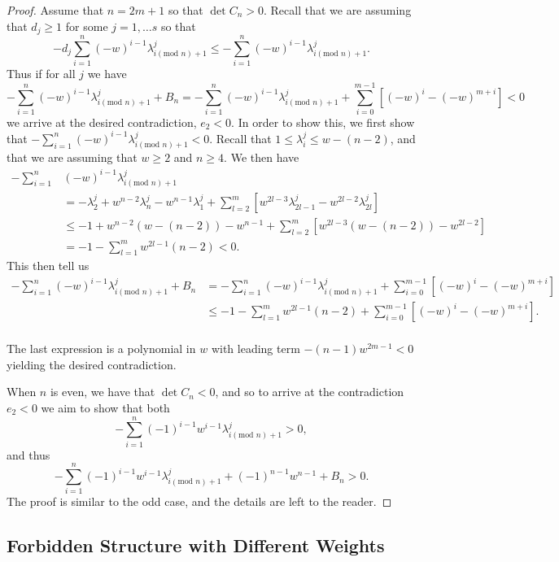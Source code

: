\documentclass [12pt,a4paper,reqno]{amsart}
\theoremstyle{plain}
\theoremstyle{definition}
\newtheorem{Assumptions and Discussion}[Theorem]{Assumptions and Discussion}
\theoremstyle{remark}
\begin{document}
\begin{proof}
Assume that $n=2m+1$ so that $\det C_n>0$. Recall that we are assuming that $d_j\geq 1$ for some $j=1,\dots s$ so that \[-d_j\sum_{i=1}^{n}(-w)^{i-1}\lambda_{i(\text{mod }n)+1}^{j}\leq-\sum_{i=1}^{n}(-w)^{i-1}\lambda_{i(\text{mod }n)+1}^{j}.\]
Thus if for all $j$ we have  
\[
-\sum_{i=1}^{n}(-w)^{i-1}\lambda_{i(\text{mod }n)+1}^{j}+B_n =-\sum_{i=1}^{n}(-w)^{i-1}\lambda_{i(\text{mod }n)+1}^{j} +\sum_{i=0}^{m-1}\left[(-w)^{i}-(-w)^{m+i}\right]<0
\]
we arrive at the desired contradiction, $e_{2}<0$.  In order to show this, we first show that  $-\sum_{i=1}^{n}(-w)^{i-1}\lambda_{i(\text{mod }n)+1}^{j}<0$.
Recall that $1\leq\lambda_i^j\leq w-(n-2)$, and that we are assuming that $w\geq 2$ and $n\geq 4$. We then have
\begin{align*}
-\sum_{i=1}^{n}&(-w)^{i-1}\lambda_{i(\text{mod }n)+1}^{j}\\
&=-\lambda_2^j+w^{n-2}\lambda_{n}^j-w^{n-1}\lambda_1^j+ \sum_{l=2}^{m}\left[w^{2l-3}\lambda_{2l-1}^{j}-w^{2l-2}\lambda_{2l}^{j}\right]\\
&\leq -1 +w^{n-2}(w-(n-2))-w^{n-1}+\sum_{l=2}^{m}\left[w^{2l-3}(w-(n-2))-w^{2l-2}\right]\\
&=-1-\sum_{l=1}^{m}w^{2l-1}(n-2)<0.
\end{align*}
This then tell us 
\begin{align*}
-\sum_{i=1}^{n}(-w)^{i-1}\lambda_{i(\text{mod }n)+1}^{j}+B_n &= -\sum_{i=1}^{n}(-w)^{i-1}\lambda_{i(\text{mod }n)+1}^{j} +\sum_{i=0}^{m-1}\left[(-w)^{i}-(-w)^{m+i}\right]\\
&\leq -1-\sum_{l=1}^{m}w^{2l-1}(n-2)+\sum_{i=0}^{m-1}\left[(-w)^{i}-(-w)^{m+i}\right].\\
\end{align*}

The last expression is a polynomial in $w$ with leading term $-(n-1)w^{2m-1}<0$ yielding the desired contradiction. 


When $n$ is even, we have that $\det C_n<0$, and so to arrive at the contradiction $e_2<0$ we aim to show that both 
\[-\sum_{i=1}^{n}(-1)^{i-1}w^{i-1}\lambda_{i(\text{mod }n)+1}^{j}>0,\] and thus
\[-\sum_{i=1}^{n}(-1)^{i-1}w^{i-1}\lambda_{i(\text{mod }n)+1}^{j}+(-1)^{n-1}w^{n-1}+B_n>0.\] The proof is similar to the odd case, and the details are left to the reader. 



\end{proof}

\subsection{Forbidden Structure with Different Weights}
\end{document}
